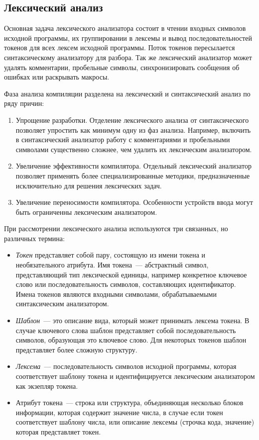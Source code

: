 \subsection{Лексический анализ} \label{sub111}

Основная задача лексического анализатора состоит в чтении входных символов исходной программы, их группировании в лексемы и вывод последовательностей токенов для всех лексем исходной программы. Поток токенов пересылается синтаксическому анализатору для разбора. Так же лексический анализатор может удалять комментарии, пробельные символы, синхронизировать сообщения об ошибках или раскрывать макросы.

Фаза анализа компиляции разделена на лексический и синтаксический анализ по ряду причин: 

\begin{enumerate} 
	\item{Упрощение разработки. Отделение лексического анализа от синтаксического позволяет упростить как минимум одну из фаз анализа. Например, включить в синтаксический анализатор работу с комментариями и пробельными символами существенно сложнее, чем удалить их лексическим анализатором.}
	\item{Увеличение эффективности компилятора. Отдельный лексический анализатор позволяет применять более специализированные методики, предназначенные исключительно для решения лексических задач.}
	\item{Увеличение переносимости компилятора. Особенности устройств ввода могут быть ограниченны лексическим анализатором.}
\end{enumerate}


При рассмотрении лексического анализа используются три связанных, но различных термина:


\begin{itemize} 
	\item{\textit{Токен} представляет собой пару, состоящую из имени токена и необязательного атрибута. Имя токена~--- абстрактный символ, представляющий тип лексической единицы, например конкретное ключевое слово или последовательность символов, составляющих идентификатор. Имена токенов являются входными символами, обрабатываемыми синтаксическим анализатором.}
	\item{\textit{Шаблон}~--- это описание вида, который может принимать лексема токена. В случае ключевого слова шаблон представляет собой последовательность символов, образующая это ключевое слово. Для некоторых токенов шаблон представляет более сложную структуру.}
	\item{\textit{Лексема}~--- последовательность символов исходной программы, которая соответствует шаблону токена и идентифицируется лексическим анализатором как экзепляр токена.}
	\item{Атрибут токена~--- строка или структура, объединяющая несколько блоков информации, которая содержит значение числа, в случае если токен соответствует шаблону числа, или описание лексемы (строчка кода, значение) которая представляет токен. }
\end{itemize}



